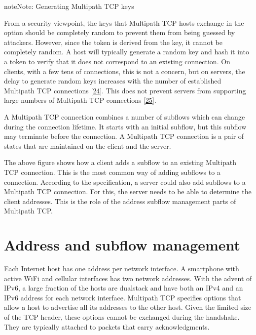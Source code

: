 \documentclass[letterpaper,10pt,english]{sphinxmanual}
\begin{document}
\begin{sphinxadmonition}{note}{Note:}
\sphinxAtStartPar
Generating Multipath TCP keys

\sphinxAtStartPar
From a security viewpoint, the keys that Multipath TCP hosts exchange in the  option should be completely random to prevent them from being guessed by attackers. However, since the token is derived from the key, it cannot be completely random. A host will typically generate a random key and hash it into a token to verify that it does not correspond to an existing connection. On clients, with a few tens of connections, this is not a concern, but on servers, the delay to generate random keys increases with the number of established Multipath TCP connections {[}\hyperlink{cite.biblio:id8941}{24}{]}. This does not prevent servers from supporting large numbers of Multipath TCP connections {[}\hyperlink{cite.biblio:id9001}{25}{]}.
\end{sphinxadmonition}

\sphinxAtStartPar
A Multipath TCP connection combines a number of subflows which can change during the connection lifetime. It starts with an initial subflow, but this subflow may terminate before the connection. A Multipath TCP connection is a pair of states that are maintained on the client and the server.

\sphinxAtStartPar
The above figure shows how a client adds a subflow to an existing Multipath TCP connection. This is the most common way of adding subflows to a connection. According to the specification, a server could also add subflows to a Multipath TCP connection. For this, the server needs to be able to determine the client addresses. This is the role of the address subflow management parts of Multipath TCP.


\section{Address and subflow management}
\label{\detokenize{mptcp:address-and-subflow-management}}\label{\detokenize{mptcp:mptcp-addr-management}}
\sphinxAtStartPar
Each Internet host has one address per network interface. A smartphone with active Wi\sphinxhyphen{}Fi and cellular interfaces has two network addresses. With the advent of IPv6, a large fraction of the hosts are dual\sphinxhyphen{}stack and have both an IPv4 and an IPv6 address for each network interface. Multipath TCP specifies options that allow a host to advertise all its addresses to the other host. Given the limited size of the TCP header, these options cannot be exchanged during the handshake. They are typically attached to packets that carry acknowledgments.
\end{document}
